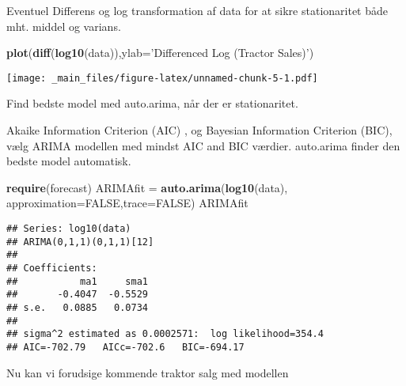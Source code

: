 \documentclass[]{book}
\newenvironment{Shaded}{\begin{snugshade}}{\end{snugshade}}
\newcommand{\DataTypeTok}[1]{\textcolor[rgb]{0.13,0.29,0.53}{#1}}
\newcommand{\DecValTok}[1]{\textcolor[rgb]{0.00,0.00,0.81}{#1}}
\newcommand{\KeywordTok}[1]{\textcolor[rgb]{0.13,0.29,0.53}{\textbf{#1}}}
\newcommand{\NormalTok}[1]{#1}
\newcommand{\OperatorTok}[1]{\textcolor[rgb]{0.81,0.36,0.00}{\textbf{#1}}}
\newcommand{\OtherTok}[1]{\textcolor[rgb]{0.56,0.35,0.01}{#1}}
\newcommand{\StringTok}[1]{\textcolor[rgb]{0.31,0.60,0.02}{#1}}
\begin{document}
Eventuel Differens og log transformation af data for at sikre stationaritet både mht. middel og varians.

\begin{Shaded}
\begin{Highlighting}[]
\KeywordTok{plot}\NormalTok{(}\KeywordTok{diff}\NormalTok{(}\KeywordTok{log10}\NormalTok{(data)),}\DataTypeTok{ylab=}\StringTok{'Differenced Log (Tractor Sales)'}\NormalTok{)}
\end{Highlighting}
\end{Shaded}

\texttt{[image: \_main\_files/figure-latex/unnamed-chunk-5-1.pdf]}

Find bedste model med auto.arima, når der er stationaritet.

Akaike Information Criterion (AIC) , og Bayesian Information Criterion (BIC), vælg ARIMA modellen med mindst AIC and BIC værdier. auto.arima finder den bedste model automatisk.

\begin{Shaded}
\begin{Highlighting}[]
\KeywordTok{require}\NormalTok{(forecast)}
\NormalTok{ARIMAfit =}\StringTok{ }\KeywordTok{auto.arima}\NormalTok{(}\KeywordTok{log10}\NormalTok{(data), }\DataTypeTok{approximation=}\OtherTok{FALSE}\NormalTok{,}\DataTypeTok{trace=}\OtherTok{FALSE}\NormalTok{)}
\NormalTok{ARIMAfit}
\end{Highlighting}
\end{Shaded}

\begin{verbatim}
## Series: log10(data) 
## ARIMA(0,1,1)(0,1,1)[12] 
## 
## Coefficients:
##           ma1     sma1
##       -0.4047  -0.5529
## s.e.   0.0885   0.0734
## 
## sigma^2 estimated as 0.0002571:  log likelihood=354.4
## AIC=-702.79   AICc=-702.6   BIC=-694.17
\end{verbatim}

Nu kan vi forudsige kommende traktor salg med modellen

\begin{Shaded}
\end{Shaded}
\end{document}
